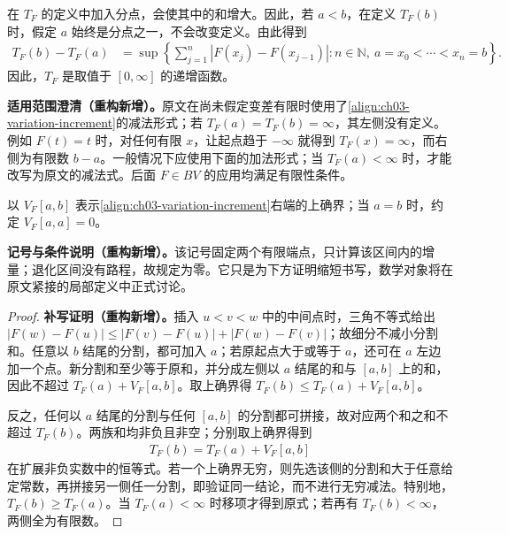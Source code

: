 \documentclass[../../main.tex]{subfiles}%
\begin{document}
\begin{proposition}\label{proposition:ch03-variation-additivity}
在 $T_F$ 的定义中加入分点，会使其中的和增大。因此，若 $a<b$，在定义 $T_F(b)$ 时，假定 $a$ 始终是分点之一，不会改变定义。由此得到
\begin{align}\label{align:ch03-variation-increment}
T_F(b)-T_F(a)
&=\sup\left\{\sum_{j=1}^n|F(x_j)-F(x_{j-1})|:
n\in\mathbb N,\ a=x_0<\cdots<x_n=b\right\}.
\end{align}
因此，$T_F$ 是取值于 $[0,\infty]$ 的递增函数。
\end{proposition}
\begin{remark}
\textbf{适用范围澄清（重构新增）。}原文在尚未假定变差有限时使用了\cref{align:ch03-variation-increment}的减法形式；若 $T_F(a)=T_F(b)=\infty$，其左侧没有定义。例如 $F(t)=t$ 时，对任何有限 $x$，让起点趋于 $-\infty$ 就得到 $T_F(x)=\infty$，而右侧为有限数 $b-a$。一般情况下应使用下面的加法形式；当 $T_F(a)<\infty$ 时，才能改写为原文的减法式。后面 $F\in BV$ 的应用均满足有限性条件。
\end{remark}
\begin{definition*}[本补证的局部记号]\label{definition:ch03-local-variation-notation-supplement}
以 $V_F[a,b]$ 表示\cref{align:ch03-variation-increment}右端的上确界；当 $a=b$ 时，约定 $V_F[a,a]=0$。
\end{definition*}
\begin{remark}
\textbf{记号与条件说明（重构新增）。}该记号固定两个有限端点，只计算该区间内的增量；退化区间没有路程，故规定为零。它只是为下方证明缩短书写，数学对象将在原文紧接的局部定义中正式讨论。
\end{remark}
\begin{proof}
\textbf{补写证明（重构新增）。}插入 $u<v<w$ 中的中间点时，三角不等式给出
$|F(w)-F(u)|\le|F(v)-F(u)|+|F(w)-F(v)|$；故细分不减小分割和。任意以 $b$ 结尾的分割，都可加入 $a$；若原起点大于或等于 $a$，还可在 $a$ 左边加一个点。新分割和至少等于原和，并分成左侧以 $a$ 结尾的和与 $[a,b]$ 上的和，因此不超过 $T_F(a)+V_F[a,b]$。取上确界得 $T_F(b)\le T_F(a)+V_F[a,b]$。

反之，任何以 $a$ 结尾的分割与任何 $[a,b]$ 的分割都可拼接，故对应两个和之和不超过 $T_F(b)$。两族和均非负且非空；分别取上确界得到
\begin{align*}
T_F(b)=T_F(a)+V_F[a,b]
\end{align*}
在扩展非负实数中的恒等式。若一个上确界无穷，则先选该侧的分割和大于任意给定常数，再拼接另一侧任一分割，即验证同一结论，而不进行无穷减法。特别地，$T_F(b)\ge T_F(a)$。当 $T_F(a)<\infty$ 时移项才得到原式；若再有 $T_F(b)<\infty$，两侧全为有限数。
\end{proof}
\end{document}
